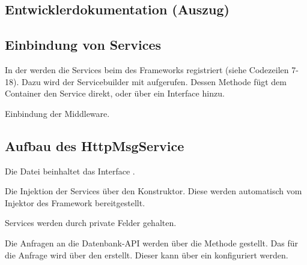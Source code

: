 \subsection{Entwicklerdokumentation (Auszug)}
\label{app:EntwicklerDoku}
\subsection*{Einbindung von Services}
In der  werden die Services beim  des Frameworks registriert (siehe Codezeilen 7-18).
Dazu wird der Servicebuilder mit  aufgerufen. Dessen Methode 
fügt dem Container den Service direkt, oder über ein Interface hinzu.


Einbindung der Middleware.

\clearpage

\subsection*{Aufbau des HttpMsgService}
Die Datei  beinhaltet das Interface . 


Die Injektion der Services über den Konstruktor. Diese werden automatisch vom Injektor des Framework 
bereitgestellt. 


Services werden durch private Felder gehalten.


Die Anfragen an die Datenbank-API werden über die Methode  gestellt.
Das  für die Anfrage wird über den  erstellt.
Dieser kann über ein  konfiguriert werden.

\clearpage

